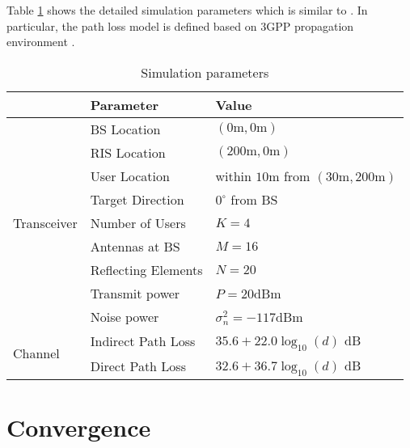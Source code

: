 Table \ref{tab:reference_parameters} shows the detailed simulation parameters which is similar to \cite{guo2020ris}. 
In particular, the path loss model is defined based on 3GPP propagation environment \cite{3gpp.36.814}.

\begin{table}[h!]
  \caption{Simulation parameters}
  \centering
  \begin{tabular}{lll}
                                & Parameter                          & Value                                \\ \hline
  \multirow{9}{*}{Transceiver}  & BS Location                        & $(0\mathrm{m},0\mathrm{m})$          \\
                                & RIS Location                       & $(200\mathrm{m},0\mathrm{m})$        \\
                                & User Location                      & within $10\mathrm{m}$ from $(30\mathrm{m},200\mathrm{m})$ \\
                                & Target Direction                   & $0^\circ$ from BS                    \\
                                & Number of Users                    & $K = 4$                              \\
                                & Antennas at BS                     & $M = 16$                             \\
                                & Reflecting Elements                & $N = 20$                             \\
                                & Transmit power                     & $P = 20$dBm                         \\
                                & Noise power                        & $\sigma _n^2 =  - 117$dBm           \\ \hline
  \multirow{2}{*}{Channel}      
                                & Indirect Path Loss                 & $35.6+22.0 \log_{10}(d)$ dB          \\
                                & Direct Path Loss                   & $32.6+36.7 \log_{10}(d)$ dB
  \end{tabular}
  \label{tab:reference_parameters}
\end{table}

\section{Convergence}\label{sec:convergence}
  

